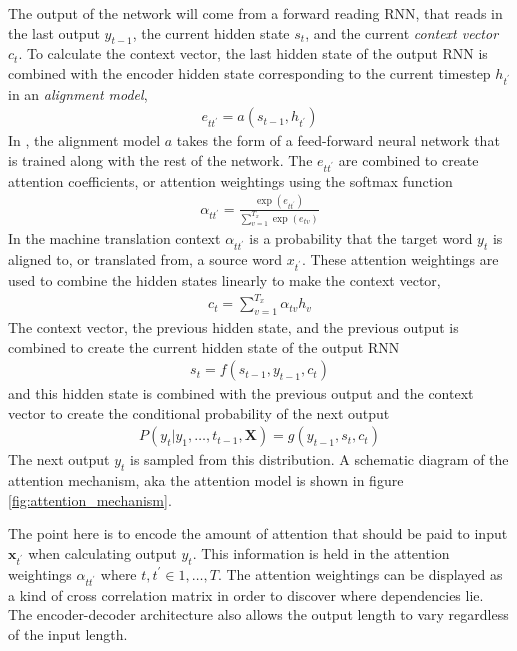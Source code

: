 \documentclass[a4paper,12pt]{article}
\theoremstyle{definition}
\begin{document}
The output of the network will come from a forward reading RNN, that reads in the last output $y_{t-1}$, the current hidden state $s_t$, and the current \textit{context vector} $c_t$. To calculate the context vector, the last hidden state of the output RNN is combined with the encoder hidden state corresponding to the current timestep $h_{t^{\prime}}$ in an \textit{alignment model},
\begin{align}
	e_{tt^{\prime}} = a(s_{t-1}, h_{t^{\prime}})
\end{align}
In \cite{bahdanau}, the alignment model $a$ takes the form of a feed-forward neural network that is trained along with the rest of the network. The $e_{tt^{\prime}}$ are combined to create attention coefficients, or attention weightings using the softmax function
\begin{align}
	\alpha_{tt^{\prime}} = \frac{\exp(e_{tt^{\prime}})}{\sum_{v=1}^{T_x} \exp(e_{tv})}
\end{align}
In the machine translation context $\alpha_{tt^{\prime}}$ is a probability that the target word $y_t$ is aligned to, or translated from, a source word $x_{t^{\prime}}$. These attention weightings are used to combine the hidden states linearly to make the context vector,
\begin{align}
	c_t = \sum_{v=1}^{T_x}\alpha_{tv}h_v
\end{align}
The context vector, the previous hidden state, and the previous output is combined to create the current hidden state of the output RNN
\begin{align}
	s_t = f(s_{t-1}, y_{t-1}, c_t)
\end{align}
and this hidden state is combined with the previous output and the context vector to create the conditional probability of the next output
\begin{align}
	P(y_t | y_{1},\dots,t_{t-1}, \mathbf{X}) = g(y_{t-1}, s_t, c_t)
\end{align}
The next output $y_t$ is sampled from this distribution. A schematic diagram of the attention mechanism, aka the attention model is shown in figure \ref{fig:attention_mechanism}.

The point here is to encode the amount of attention that should be paid to input $\mathbf{x}_{t^{\prime}}$ when calculating output $y_t$. This information is held in the attention weightings $\alpha_{tt^{\prime}}$ where $t,t^{\prime} \in {1, \dots, T}$. The attention weightings can be displayed as a kind of cross correlation matrix in order to discover where dependencies lie. The encoder-decoder architecture also allows the output length to vary regardless of the input length.
\end{document}
